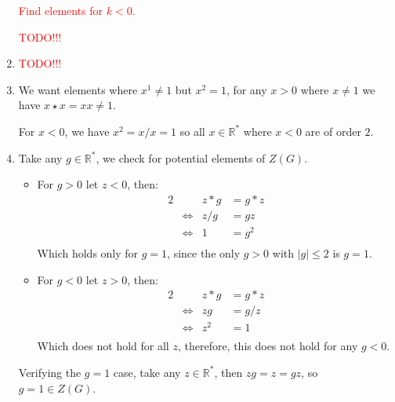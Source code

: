 \documentclass[a4paper, 11pt]{article}
\newcommand{\RR}{\mathbb{R}}
\begin{document}
\begin{enumerate}[label=(\alph*)]
	\textcolor{red}{Find elements for $k<0$.}
	
	\textcolor{red}{TODO!!!}
	\item 
	\textcolor{red}{TODO!!!}

	
	\item 
	We want elements where $x^1\neq 1$ but $x^2=1$, for any $x>0$ where $x\neq 1$ we have $x\star x = xx \neq 1$.

	For $x<0$, we have $x^2=x/x=1$ so all $x\in\RR^*$ where $x<0$ are of order $2$. 
	
	\item 
	Take any $g\in\RR^*$, we check for potential elements of $Z(G)$. 

	\begin{itemize}
		\item For $g>0$ let $z<0$, then:
		\begin{alignat*}{2}
			&          & z*g &= g*z   \\
			& \iff     & z/g &= gz    \\ 
			& \iff     & 1   &= g^2  \\ 
		\end{alignat*}
		Which holds only for $g=1$, since the only $g>0$ with $|g|\leq 2$ is $g=1$. 

		\item For $g<0$ let $z>0$, then:
		\begin{alignat*}{2}
			&          & z*g &= g*z \\
			& \iff     & zg  &= g/z \\ 
			& \iff     & z^2 &= 1   \\ 
		\end{alignat*}
		Which does not hold for all $z$, therefore, this does not hold for any $g<0$. 
	\end{itemize}
	Verifying the $g=1$ case, take any $z\in\RR^*$, then $zg = z = gz$, so $g=1\in Z(G)$. 

\end{enumerate}

\pagebreak
\end{document}
